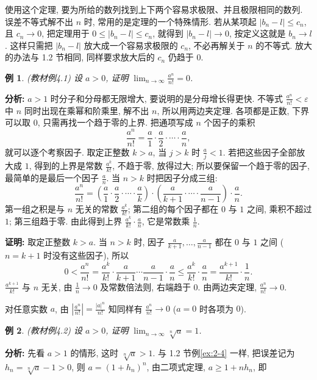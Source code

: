 \documentclass[UTF8,openany]{ctexbook}
\theoremstyle{chinesetextbook}
\newtheorem{example}{例}[section]
\newenvironment{cnproof}{\par\indent\textbf{证明:} \ignorespaces}{\par}
\begin{document}
使用这个定理, 要为所给的数列找到上下两个容易求极限、并且极限相同的数列. 误差不等式解不出 $n$ 时, 常用的是定理的一个特殊情形. 若从某项起 $|b_n-l|\le c_n$, 且 $c_n\to0$, 把定理用于 $0\le|b_n-l|\le c_n$, 就得到 $|b_n-l|\to0$, 按定义这就是 $b_n\to l$. 这样只需把 $|b_n-l|$ 放大成一个容易求极限的 $c_n$, 不必再解关于 $n$ 的不等式. 放大的办法与 1.2 节相同, 同样要求放大后的 $c_n$ 仍趋于 $0$.
\begin{example}\label{ex:4-1}
\textnormal{(教材例4.1)} 设 $a>0$, 证明 $\displaystyle\lim_{n\to\infty}\frac{a^n}{n!}=0$.
\end{example}
\par\indent\textbf{分析:} $a>1$ 时分子和分母都无限增大, 要说明的是分母增长得更快. 不等式 $\displaystyle\frac{a^n}{n!}<\varepsilon$ 中 $n$ 同时出现在乘幂和阶乘里, 解不出 $n$, 所以用两边夹定理. 各项都是正数, 下界可以取 $0$, 只需再找一个趋于零的上界. 把通项写成 $n$ 个因子的乘积
\[
\frac{a^n}{n!}=\frac a1\cdot\frac a2\cdot\cdots\cdot\frac an,
\]
就可以逐个考察因子. 取定正整数 $k>a$, 当 $j>k$ 时 $\displaystyle\frac aj<1$. 若把这些因子全部放大成 $1$, 得到的上界是常数 $\displaystyle\frac{a^k}{k!}$, 不趋于零, 放得过大; 所以要保留一个趋于零的因子, 最简单的是最后一个因子 $\displaystyle\frac an$. 当 $n>k$ 时把因子分成三组:
\[
\frac{a^n}{n!}=\left(\frac a1\cdot\frac a2\cdot\cdots\cdot\frac ak\right)\cdot\left(\frac a{k+1}\cdot\cdots\cdot\frac a{n-1}\right)\cdot\frac an.
\]
第一组之积是与 $n$ 无关的常数 $\displaystyle\frac{a^k}{k!}$; 第二组的每个因子都在 $0$ 与 $1$ 之间, 乘积不超过 $1$; 第三组趋于零. 由此得到上界 $\displaystyle\frac{a^k}{k!}\cdot\frac an$, 它是常数乘 $\displaystyle\frac1n$.
\begin{cnproof}
取定正整数 $k>a$. 当 $n>k$ 时, 因子 $\displaystyle\frac a{k+1},\ldots,\frac a{n-1}$ 都在 $0$ 与 $1$ 之间 ($n=k+1$ 时没有这些因子), 所以
\[
0<\frac{a^n}{n!}=\frac{a^k}{k!}\cdot\frac a{k+1}\cdots\frac a{n-1}\cdot\frac an\le\frac{a^k}{k!}\cdot\frac an=\frac{a^{k+1}}{k!}\cdot\frac1n.
\]
$\displaystyle\frac{a^{k+1}}{k!}$ 与 $n$ 无关, 由 $\displaystyle\frac1n\to0$ 及常数倍法则, 右端趋于 $0$. 由两边夹定理, $\displaystyle\frac{a^n}{n!}\to0$.
\end{cnproof}
对任意实数 $a$, 由 $\displaystyle\left|\frac{a^n}{n!}\right|=\frac{|a|^n}{n!}$ 知同样有 $\displaystyle\frac{a^n}{n!}\to0$ ($a=0$ 时各项为 $0$).
\begin{example}\label{ex:4-2}
\textnormal{(教材例4.2)} 设 $a>0$, 证明 $\displaystyle\lim_{n\to\infty}\sqrt[n]a=1$.
\end{example}
\par\indent\textbf{分析:} 先看 $a>1$ 的情形, 这时 $\sqrt[n]a>1$. 与 1.2 节例\ref{ex:2-4} 一样, 把误差记为 $h_n=\sqrt[n]a-1>0$, 则 $a=(1+h_n)^n$, 由二项式定理, $a\ge1+nh_n$, 即
\end{document}
